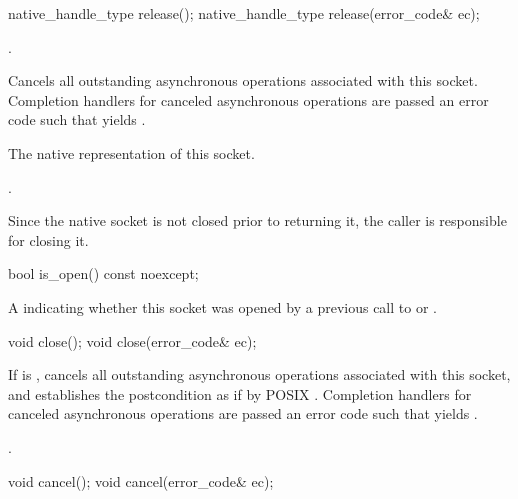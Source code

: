 \begin{itemdecl}
native_handle_type release();
native_handle_type release(error_code& ec);
\end{itemdecl}

\begin{itemdescr}
\pnum
\expects {}.

\pnum
\effects Cancels all outstanding asynchronous operations associated with this socket.
Completion handlers for canceled asynchronous operations are passed an error code 
such that  yields .

\pnum
\returns The native representation of this socket.

\pnum
\postconditions {}.

\pnum
\remarks Since the native socket is not closed prior to returning it,
the caller is responsible for closing it.
\end{itemdescr}

\begin{itemdecl}
bool is_open() const noexcept;
\end{itemdecl}

\begin{itemdescr}
\pnum
\returns A  indicating whether this socket was opened by a previous call to  or .
\end{itemdescr}

\begin{itemdecl}
void close();
void close(error_code& ec);
\end{itemdecl}

\begin{itemdescr}
\pnum
\effects If  is , cancels all outstanding asynchronous operations associated with this socket, and establishes the postcondition as if by POSIX . Completion handlers for canceled asynchronous operations are passed an error code  such that  yields .

\pnum
\postconditions {}.
\end{itemdescr}

\begin{itemdecl}
void cancel();
void cancel(error_code& ec);
\end{itemdecl}

